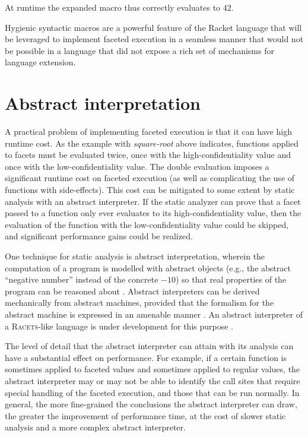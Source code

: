 \documentclass{article}
\begin{document}
At runtime the expanded macro thus correctly evaluates to 42.

Hygienic syntactic macros are a powerful feature of the Racket language that will be leveraged to implement faceted execution in a seamless manner that would not be possible in a language that did not expose a rich set of mechanisms for language extension.



\section{Abstract interpretation}
A practical problem of implementing faceted execution is that it can have high runtime cost. As the example with \textit{square-root} above indicates, functions applied to facets must be evaluated twice, once with the high-confidentiality value and once with the low-confidentiality value. The double evaluation imposes a significant runtime cost on faceted execution (as well as complicating the use of functions with side-effects). This cost can be mitigated to some extent by static analysis with an abstract interpreter. If the static analyzer can prove that a facet passed to a function only ever evaluates to its high-confidentiality value, then the evaluation of the function with the low-confidentiality value could be skipped, and significant performance gains could be realized.

One technique for static analysis is abstract interpretation, wherein the computation of a program is modelled with abstract objects (e.g., the abstract ``negative number'' instead of the concrete $-10$) so that real properties of the program can be reasoned about \cite{ai-original}. Abstract interpreters can be derived mechanically from abstract machines, provided that the formalism for the abstract machine is expressed in an amenable manner \cite{aam}. An abstract interpreter of a \textsc{Racets}-like language is under development for this purpose \cite{abstract-inter}.

The level of detail that the abstract interpreter can attain with its analysis can have a substantial effect on performance. For example, if a certain function is sometimes applied to faceted values and sometimes applied to regular values, the abstract interpreter may or may not be able to identify the call sites that require special handling of the faceted execution, and those that can be run normally. In general, the more fine-grained the conclusions the abstract interpreter can draw, the greater the improvement of performance time, at the cost of slower static analysis and a more complex abstract interpreter.
\end{document}
